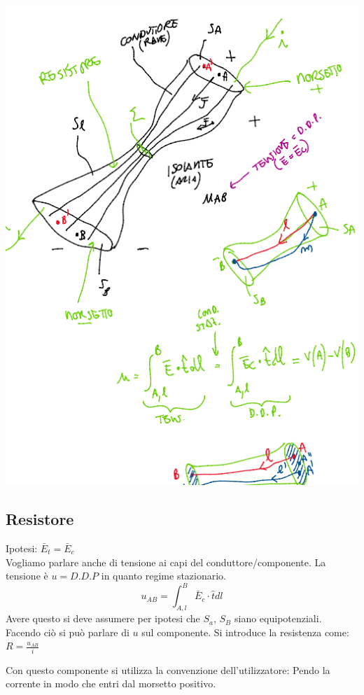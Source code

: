     \begin{center}
        \includegraphics[scale = 0.5]{immagini/image14.png}
    \end{center}

    \subsection{Resistore}
        Ipotesi: $\bar E_t = \bar E_c$\\
        Vogliamo parlare anche di tensione ai capi del conduttore/componente. La tensione è $u = D.D.P$ in quanto regime stazionario.
        \[
            u_{AB} = \int_{A,l}^B \bar E_c \cdot\hat{t} dl
        \]
        Avere questo si deve assumere per ipotesi che $S_a$, $S_B$ siano equipotenziali. Facendo ciò si può parlare di $u$ sul componente. Si introduce la resistenza come: $R = \frac{u_{AB}}{i}$

        Con questo componente si utilizza la convenzione dell'utilizzatore: Pendo la corrente in modo che entri dal morsetto positivo.
        
